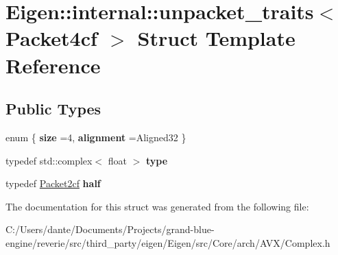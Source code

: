 \hypertarget{struct_eigen_1_1internal_1_1unpacket__traits_3_01_packet4cf_01_4}{}\section{Eigen\+::internal\+::unpacket\+\_\+traits$<$ Packet4cf $>$ Struct Template Reference}
\label{struct_eigen_1_1internal_1_1unpacket__traits_3_01_packet4cf_01_4}
\subsection*{Public Types}
\begin{DoxyCompactItemize}
\item 
\mbox{\label{struct_eigen_1_1internal_1_1unpacket__traits_3_01_packet4cf_01_4_a7b650a351a4506e798d8c82c062676f8}} 
enum \{ {\bfseries size} =4, 
{\bfseries alignment} =Aligned32
 \}
\item 
\mbox{\label{struct_eigen_1_1internal_1_1unpacket__traits_3_01_packet4cf_01_4_a773efaaaefd66fb0ec4e7c373a0bfbfa}} 
typedef std\+::complex$<$ float $>$ {\bfseries type}
\item 
\mbox{\label{struct_eigen_1_1internal_1_1unpacket__traits_3_01_packet4cf_01_4_a9a499a2f3adbbc1c38bbed310c0ca59b}} 
typedef \mbox{\hyperlink{struct_eigen_1_1internal_1_1_packet2cf}{Packet2cf}} {\bfseries half}
\end{DoxyCompactItemize}


The documentation for this struct was generated from the following file\+:\begin{DoxyCompactItemize}
\item 
C\+:/\+Users/dante/\+Documents/\+Projects/grand-\/blue-\/engine/reverie/src/third\+\_\+party/eigen/\+Eigen/src/\+Core/arch/\+A\+V\+X/Complex.\+h\end{DoxyCompactItemize}
